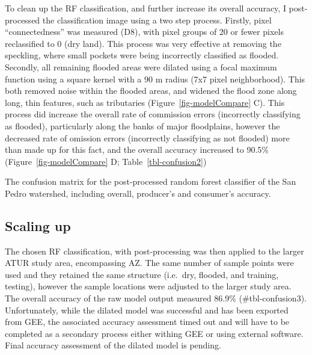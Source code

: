 \documentclass[
]{agujournal2019}
\begin{document}
To clean up the RF classification, and further increase its overall
accuracy, I post-processed the classification image using a two step
process. Firstly, pixel ``connectedness'' was measured (D8), with pixel
groups of 20 or fewer pixels reclassified to 0 (dry land). This process
was very effective at removing the speckling, where small pockets were
being incorrectly classified as flooded. Secondly, all remaining flooded
areas were dilated using a focal maximum function using a square kernel
with a 90 m radius (7x7 pixel neighborhood). This both removed noise
within the flooded areas, and widened the flood zone along long, thin
features, such as tributaries (Figure~\ref{fig-modelCompare} C). This
process did increase the overall rate of commission errors (incorrectly
classifying as flooded), particularly along the banks of major
floodplains, however the decreased rate of omission errors (incorrectly
classifying as not flooded) more than made up for this fact, and the
overall accuracy increased to 90.5\% (Figure~\ref{fig-modelCompare} D;
Table~\ref{tbl-confusion2})

\begin{table}

\caption{\label{tbl-confusion2}The confusion matrix for the
post-processed random forest classifier of the San Pedro watershed,
including overall, producer's and consumer's accuracy.}


\end{table}%

\subsection{Scaling up}\label{scaling-up}

The chosen RF classification, with post-processing was then applied to
the larger ATUR study area, encompassing AZ. The same number of sample
points were used and they retained the same structure (i.e.~dry,
flooded, and training, testing), however the sample locations were
adjusted to the larger study area. The overall accuracy of the raw model
output measured 86.9\% (\#tbl-confusion3). Unfortunately, while the
dilated model was successful and has been exported from GEE, the
associated accuracy assessment timed out and will have to be completed
as a secondary process either withing GEE or using external software.
Final accuracy assessment of the dilated model is pending.
\end{document}
